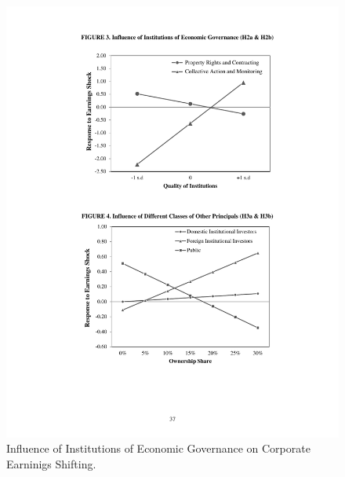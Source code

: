 \begin{figure}[h] 
	\centering	
		\caption{Influence of Institutions of Economic Governance on Corporate Earninigs Shifting.}
		\vspace{1em}
	\label{fig:InterInst}
	\includegraphics[width=1.00\textwidth]{chapter01/Interactions-PRnC.pdf}		
\end{figure}
